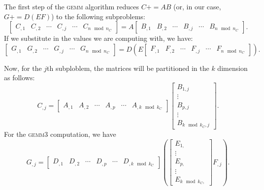 \documentclass[12pt]{article}
\newcommand*{\pluseq}{\mathrel{{+}{=}}}
\newcommand*{\gemmt}{{\textsc{gemm3}}}
\newcommand*{\gemm}{{\textsc{gemm}}}
\begin{document}
The first step of the \gemm{} algorithm reduces $C \pluseq AB$ (or, in our case, $G \pluseq D(EF)$) to the following subproblems:
\begin{equation*}
  \left[\begin{array}{c|c|c|c|c|c}
    C_{,1}&C_{,2}&\cdots&C_{,j}&\cdots& C_{n \mod n_C}
  \end{array}\right]
  = A
  \left[\begin{array}{c|c|c|c|c|c}
    B_{,1}&B_{,2}&\cdots&B_{,j}&\cdots&B_{n \mod n_C}
  \end{array}\right].
\end{equation*}
If we substitute in the values we are computing with, we have:
\begin{equation*}
  \left[\begin{array}{c|c|c|c|c|c}
    G_{,1}&G_{,2}&\cdots&G_{,j}&\cdots& G_{n \mod n_C}
  \end{array}\right]
  = D\left(
    E
    \left[\begin{array}{c|c|c|c|c|c}
      F_{,1}&F_{,2}&\cdots&F_{,j}&\cdots&F_{n \mod n_C}
    \end{array}\right]
  \right).
\end{equation*}

Now, for the $j$th subploblem, the matrices will be partitioned in the $k$ dimension as follows:
\begin{equation*}
  C_{,j}
  =
  \left[\begin{array}{c|c|c|c|c|c}
    A_{,1}&A_{,2}&\cdots&A_{,p}&\cdots&A_{,k \mod k_C}
  \end{array}\right]
  \left[\begin{array}{c}
    B_{1,j}\\\hline
    \vdots\\\hline
    B_{p,j}\\\hline
    \vdots\\\hline
    B_{k \mod k_C,j}
  \end{array}\right].
\end{equation*}
For the \gemmt{} computation, we have
\begin{equation*}
  G_{,j}
  =
  \left[\begin{array}{c|c|c|c|c|c}
    D_{,1}&D_{,2}&\cdots&D_{,p}&\cdots&D_{,k \mod k_C}
  \end{array}\right]
  \left(
  \left[\begin{array}{c}
          E_{1,}\\\hline
          \vdots\\\hline
          E_{p,}\\\hline
          \vdots\\\hline
          E_{k \mod k_C,}
  \end{array}\right]
  F_{,j}
  \right).
\end{equation*}
\end{document}
